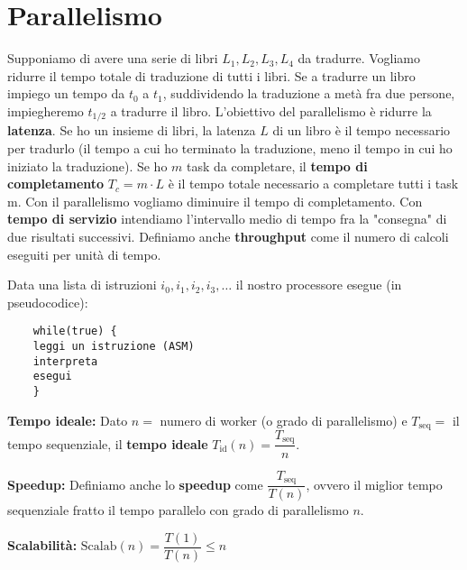 
\section{Parallelismo}

\begin{defn}

	Supponiamo di avere una serie di libri $ L_1, L_2, L_3, L_4 $ da tradurre.
	Vogliamo ridurre il tempo totale di traduzione di tutti i libri. Se a
	tradurre un libro impiego un tempo da $ t_0 $ a $ t_1 $, suddividendo la
	traduzione a metà fra due persone, impiegheremo $ t_{1/2} $ a tradurre il
	libro. L'obiettivo del parallelismo è ridurre la \textbf{latenza}. Se ho un
	insieme di libri, la latenza $ L $ di un libro è il tempo necessario per
	tradurlo (il tempo a cui ho terminato la traduzione, meno il tempo in cui ho
	iniziato la traduzione). Se ho $ m $ task da completare, il \textbf{tempo di
	completamento}  $ T_c = m \cdot L$ è il tempo totale necessario a completare
	tutti i task m. Con il parallelismo vogliamo diminuire il tempo di
	completamento. Con \textbf{tempo di servizio} intendiamo l'intervallo medio
	di tempo fra la "consegna" di due risultati successivi. Definiamo anche
	\textbf{throughput} come il numero di calcoli eseguiti per unità di tempo.
	
	Data una lista di istruzioni $ i_0, i_1, i_2, i_3, \dots $ il nostro
	processore esegue (in pseudocodice):

	\begin{lstlisting}
	while(true) {
	leggi un istruzione (ASM)
	interpreta
	esegui
	}
	\end{lstlisting} 
\end{defn}


\begin{defn}
	\textbf{Tempo ideale:}
	Dato $ n = $ numero di worker (o grado di parallelismo) e $ T_{\text{seq}} =
	$ il tempo sequenziale, il \textbf{tempo ideale} $ T_{\text{id}}(n) =
	\dfrac{T_{\text{seq}}}{n}$.
\end{defn}


\begin{defn}
	\textbf{Speedup:}
	Definiamo anche lo \textbf{speedup} come $ \dfrac{T_{\text{seq}}}{T(n)} $,
	ovvero il miglior tempo sequenziale fratto il tempo parallelo con grado di
	parallelismo $ n $.
\end{defn}

\begin{defn}
	\textbf{Scalabilità:} $ \text{Scalab}(n) = \dfrac{T(1)}{T(n)} \leq n $
\end{defn}

